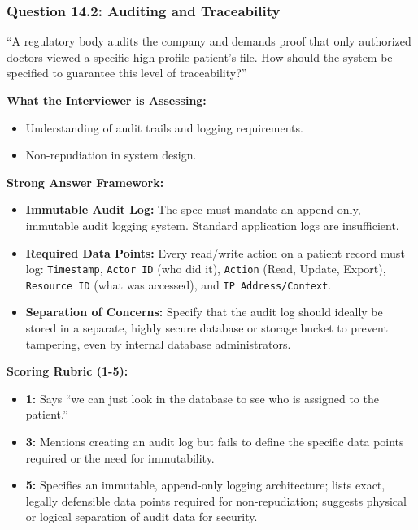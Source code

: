 \documentclass[
  11pt,
  openany,
  oneside]{book}
\providecommand{\tightlist}{%
  \setlength{\itemsep}{0pt}\setlength{\parskip}{0pt}}
\begin{document}
\subsubsection{Question 14.2: Auditing and
Traceability}\label{question-14.2-auditing-and-traceability}

``A regulatory body audits the company and demands proof that only
authorized doctors viewed a specific high-profile patient's file. How
should the system be specified to guarantee this level of
traceability?''

\textbf{What the Interviewer is Assessing:}

\begin{itemize}
\tightlist
\item
  Understanding of audit trails and logging requirements.
\item
  Non-repudiation in system design.
\end{itemize}

\textbf{Strong Answer Framework:}

\begin{itemize}
\tightlist
\item
  \textbf{Immutable Audit Log:} The spec must mandate an append-only,
  immutable audit logging system. Standard application logs are
  insufficient.
\item
  \textbf{Required Data Points:} Every read/write action on a patient
  record must log: \texttt{Timestamp}, \texttt{Actor\ ID} (who did it),
  \texttt{Action} (Read, Update, Export), \texttt{Resource\ ID} (what
  was accessed), and \texttt{IP\ Address/Context}.
\item
  \textbf{Separation of Concerns:} Specify that the audit log should
  ideally be stored in a separate, highly secure database or storage
  bucket to prevent tampering, even by internal database administrators.
\end{itemize}

\textbf{Scoring Rubric (1-5):}

\begin{itemize}
\tightlist
\item
  \textbf{1:} Says ``we can just look in the database to see who is
  assigned to the patient.''
\item
  \textbf{3:} Mentions creating an audit log but fails to define the
  specific data points required or the need for immutability.
\item
  \textbf{5:} Specifies an immutable, append-only logging architecture;
  lists exact, legally defensible data points required for
  non-repudiation; suggests physical or logical separation of audit data
  for security.
\end{itemize}
\end{document}
